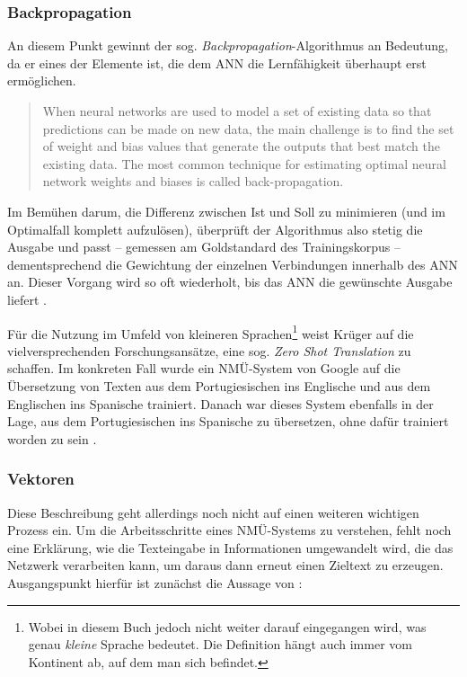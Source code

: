 \subsubsection{Backpropagation}

An diesem Punkt gewinnt der sog. \emph{Backpropagation}-Algorithmus an Bedeutung, da er eines der Elemente ist, die dem ANN die Lernfähigkeit überhaupt erst ermöglichen. 


\begin{quote}

When neural networks are used to model a set of existing data so that predictions can be made on new data, the main challenge is to find the set of weight and bias values that generate the outputs that best match the existing data. The most common technique for estimating optimal neural network weights and biases is called back-propagation. \citep{mccaffrey_test_2012}

\end{quote}


Im Bemühen darum, die Differenz zwischen Ist und Soll zu minimieren (und im Optimalfall komplett aufzulösen), überprüft der Algorithmus also stetig die Ausgabe und passt -- gemessen am Goldstandard des Trainingskorpus -- dementsprechend die Gewichtung der einzelnen Verbindungen innerhalb des ANN an. Dieser Vorgang wird so oft wiederholt, bis das ANN die gewünschte Ausgabe liefert \citep[]{habra_neural_2017}.

Für die Nutzung im Umfeld von kleineren Sprachen\footnote{Wobei in diesem Buch jedoch nicht weiter darauf eingegangen wird, was genau \emph{kleine} Sprache bedeutet. Die Definition hängt auch immer vom Kontinent ab, auf dem man sich befindet.} weist Krüger auf die vielversprechenden Forschungsansätze, eine sog. \emph{Zero Shot Translation} zu schaffen. Im konkreten Fall wurde ein NMÜ-System von Google auf die Übersetzung von Texten aus dem Portugiesischen ins Englische und aus dem Englischen ins Spanische trainiert. Danach war dieses System ebenfalls in der Lage, aus dem Portugiesischen ins Spanische zu übersetzen, ohne dafür trainiert worden zu sein \citep[40]{kruger_von_2017}.

\subsubsection{Vektoren}

Diese Beschreibung geht allerdings noch nicht auf einen weiteren wichtigen Prozess ein. Um die Arbeitsschritte eines NMÜ-Systems zu verstehen, fehlt noch eine Erklärung, wie die Texteingabe in Informationen umgewandelt wird, die das Netzwerk verarbeiten kann, um daraus dann erneut einen Zieltext zu erzeugen. Ausgangspunkt hierfür ist zunächst die Aussage von \citet[2]{bahdanau_neural_2017}: 



